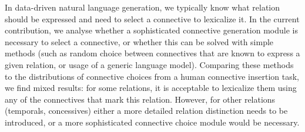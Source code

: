 In data-driven natural language generation, we typically know what relation should be expressed and need to select a connective to lexicalize it. In the current contribution, we analyse whether a sophisticated connective generation module is necessary to select a connective, or whether this can be solved with simple methods (such as random choice between connectives that are known to express a given relation, or usage of a generic language model). Comparing these methods to the distributions of connective choices from a human connective insertion task, we find mixed results: for some relations, it is acceptable to lexicalize them using any of the connectives that mark this relation. However, for other relations (temporals, concessives) either a more detailed relation distinction needs to be introduced, or a more sophisticated connective choice module would be necessary.
